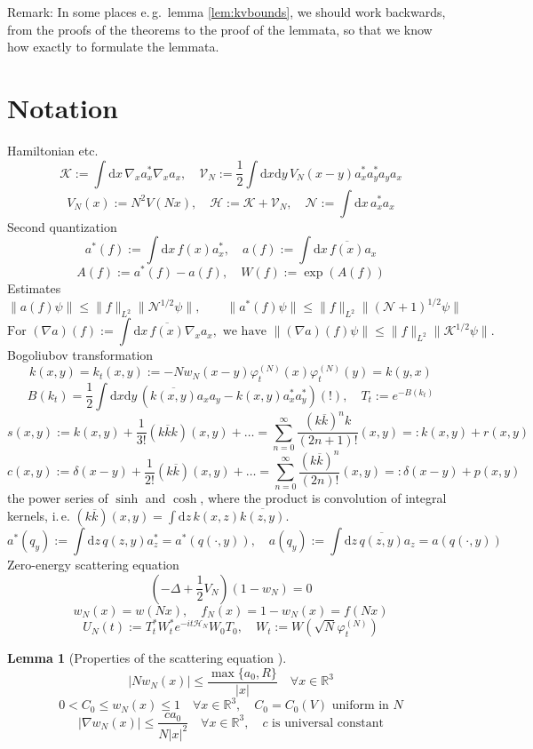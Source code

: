 \documentclass[11pt,a4paper,twoside,headsepline]{scrartcl}
\newtheorem{lem}[thm]{Lemma}
\newcommand{\di}{\textrm{d}}		%
\newcommand{\Ncal}{\mathcal{N}}		%
\newcommand{\Kcal}{\mathcal{K}}		%
\newcommand{\Vcal}{\mathcal{V}}		%
\newcommand{\Hcal}{\mathcal{H}}		%
\newcommand{\cc}[1]{\overline{#1}}	%
\newcommand{\Rbb}{\mathbb{R}}		%
\newcommand{\norm}[1]{\lVert#1\rVert}	%
\newcommand{\ph}{\varphi_t^{(N)}}	%
\newcommand{\sqn}{\sqrt{N}}		%
\newcommand{\be}[1]{\begin{equation}\label{eq:#1}}	%
\newcommand{\ee}{\end{equation}}
\newcommand{\bd}{\begin{displaymath}}			%
\newcommand{\ed}{\end{displaymath}}
\begin{document}
Remark: In some places e.\,g.\ lemma \ref{lem:kvbounds}, we should work backwards, from the proofs of the theorems to the proof of the lemmata, so that we know how exactly to formulate the lemmata.

\section{Notation}
Hamiltonian etc.
\bd
\Kcal := \int \di x\, \nabla_x a^*_x \nabla_x a_x,
\quad
\Vcal_N := \frac{1}{2}\int\di x \di y\, V_N(x-y) a^*_x a^*_y a_y a_x
\ed
\bd
V_N(x) := N^2V(Nx), \quad \Hcal := \Kcal + \Vcal_N, \quad \Ncal := \int \di x\, a^*_x a_x
\ed
Second quantization
\bd
a^*(f) := \int \di x\, f(x) a^*_x, \quad a(f) := \int \di x\, \cc{f(x)} a_x
\ed
\bd
A(f) := a^*(f) - a(f), \quad W(f) := \exp(A(f))
\ed
Estimates
\bd
\norm{a(f)\psi} \leq \norm{f}_{L^2} \norm{\Ncal^{1/2}\psi}, \qquad \norm{a^*(f)\psi} \leq \norm{f}_{L^2} \norm{(\Ncal+1)^{1/2}\psi}
\ed
\bd
\mbox{For } (\nabla a)(f) := \int \di x\, \cc{f(x)}\nabla_x a_x, \mbox{ we have } \norm{(\nabla a)(f)\psi} \leq \norm{f}_{L^2} \norm{\Kcal^{1/2}\psi}.
\ed
Bogoliubov transformation
\bd
k(x,y) = k_t(x,y) := -N w_N(x-y) \ph(x) \ph(y) = k(y,x)
\ed
\bd
B(k_t) = \frac{1}{2}\int \di x \di y\, \left( \cc{k(x,y)} a_x a_y - k(x,y) a^*_x a^*_y\right) (!), \quad T_t := e^{-B(k_t)}
\ed
\bd
s(x,y) := k(x,y) + \frac{1}{3!}(k \cc k k)(x,y) + \dots = \sum_{n=0}^\infty \frac{(k \cc k)^n k}{(2n+1)!}(x,y) =: k(x,y) + r(x,y)
\ed
\bd
c(x,y) := \delta(x-y) + \frac{1}{2!}(k \cc k)(x,y) + \dots = \sum_{n=0}^\infty \frac{(k \cc k)^n}{(2n)!}(x,y) =: \delta(x-y) + p(x,y)
\ed
the power series of $\sinh$ and $\cosh$, where the product is convolution of integral kernels, i.\,e. $(k \cc k)(x,y) = \int \di z\, k(x,z) \cc{k(z,y)}$.
\bd
a^\ast(q_y) := \int \di z\, q(z,y) a^*_z = a^*(q(\cdot,y)) , \quad a(q_y) := \int \di z\, \cc{q(z,y)} a_z = a(q(\cdot,y))
\ed
Zero-energy scattering equation
\be{scatteringequation}
\left(-\Delta + \frac{1}{2}V_N \right)(1-w_N) = 0
\ee
\bd
w_N(x) = w(Nx), \quad f_N(x) = 1-w_N(x) = f(Nx)
\ed
\bd
U_N(t) := T^*_t W^*_t e^{- i t \Hcal_N} W_0 T_0,\quad W_t := W(\sqn \ph)
\ed

\begin{lem}[Properties of the scattering equation \cite{ESY2006}]
 \bd
\lvert N w_N(x)\rvert \leq \frac{\max\{a_0,R\}}{\lvert x\rvert}\quad \forall x \in \Rbb^3
\ed
\bd
0 < C_0 \leq w_N(x) \leq 1\quad \forall x \in \Rbb^3, \quad C_0 = C_0(V) \mbox{ uniform in } N
\ed
\bd
\lvert \nabla w_N(x) \rvert \leq \frac{c a_0}{N \lvert x\rvert^2}\quad \forall x \in \Rbb^3, \quad c \mbox { is universal constant}
\ed
\end{lem}
\end{document}
